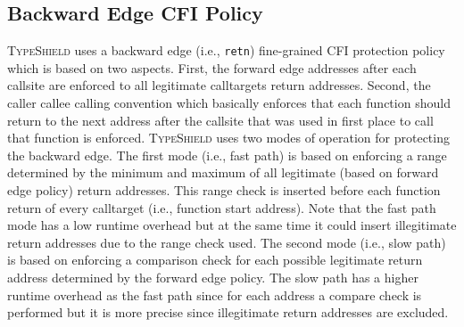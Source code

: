 \subsection{Backward Edge CFI Policy}
\label{Backward Edge CFI Policy}
\textsc{TypeShield} uses a backward edge (i.e., \texttt{retn}) fine-grained CFI protection policy which 
is based on two aspects. First, the forward edge addresses after each callsite are enforced
to all legitimate calltargets return addresses. Second, the caller callee calling convention 
which basically enforces that each function should return to the next address after the callsite that 
was used in first place to call that function is enforced. \textsc{TypeShield} uses two modes of operation for
protecting the backward edge. The first mode (i.e., fast path) is based on enforcing a range determined by the minimum and
maximum of all legitimate (based on forward edge policy) return addresses. This range check is inserted before each function
return of every calltarget (i.e., function start address). Note that the fast path mode has a low runtime overhead but
at the same time it could insert illegitimate return addresses due to the range check used.
The second mode (i.e., slow path) is based on enforcing a comparison check for each possible legitimate
return address determined by the forward edge policy. The slow path has a higher runtime overhead as 
the fast path since for each address a compare check is performed but it is more precise since 
illegitimate return addresses are excluded.


